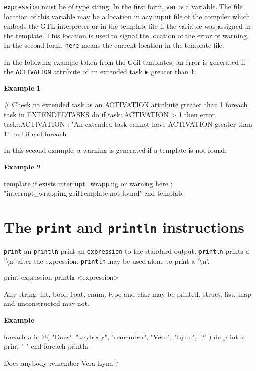 \documentclass[10pt,openright,twosides]{report}
\newcommand{\gtltype}[1]{{\small\ttfamily #1}}
\newcommand{\icst}[1]{{\footnotesize\ttfamily\colorbox{light-blue}{#1}}}
\newcommand{\ccst}[1]{{\footnotesize\ttfamily\colorbox{light-blue}{'#1'}}}
\newcommand{\gtlinline}[1]{\colorbox{light-blue}{\lstinline[language=gtl]{#1}}}
\newcommand{\example}{\vspace{.75em}\noindent\textbf{Example}\vspace{0em}}
\newcommand{\examplen}[1]{\vspace{.75em}\noindent\textbf{Example #1}\vspace{0em}}
\begin{document}
\gtlinline{expression} must be of type \gtltype{string}. In the first form, \gtlinline{var} is a  variable. The file location of this variable may be a location in any input file of the compiler which embeds the GTL interpreter or in the template file if the variable was assigned in the template. This location is used to signal the location of the error or warning. In the second form, \gtlinline{here} means the current location in the template file.

In the following example taken from the Goil templates, an error is generated if the \texttt{\footnotesize ACTIVATION} attribute of an extended task is greater than \icst{1}:

\examplen{1}
\begin{gtl}
# Check no extended task as an ACTIVATION attribute greater than 1
foreach task in EXTENDEDTASKS do
  if task::ACTIVATION > 1 then
    error task::ACTIVATION : "An extended task cannot have ACTIVATION greater than 1"
  end if
end foreach
\end{gtl}

In this second example, a warning is generated if a template is not found:

\examplen{2}
\begin{gtl}
template if exists interrupt_wrapping or
  warning here : "interrupt_wrapping.goilTemplate not found"
end template
\end{gtl}

\section{The \texttt{print} and \texttt{println} instructions}

\gtlinline{print} an \gtlinline{println} print an \gtlinline{expression} to the standard output. \gtlinline{println} prints a \ccst{\textbackslash n} after the expression. \gtlinline{println} may be used alone to print a \ccst{\textbackslash n}.

\begin{gtl}
print expression
println <expression>
\end{gtl}

Any \gtltype{string}, \gtltype{int}, \gtltype{bool}, \gtltype{float}, \gtltype{enum}, \gtltype{type} and \gtltype{char} may be printed. \gtltype{struct}, \gtltype{list}, \gtltype{map} and \gtltype{unconstructed} may not.

\example
\begin{gtl}
foreach a in @( "Does", "anybody", "remember", "Vera", "Lynn", '?' ) do
  print a 
  print " "
end foreach
println
\end{gtl}
\begin{console}
Does anybody remember Vera Lynn ? 
\end{console}
\end{document}
